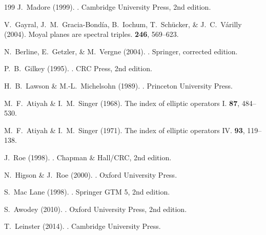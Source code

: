 \documentclass[11pt,a4paper,openright]{book}
\theoremstyle{plain}
\theoremstyle{definition}
\begin{document}
\begin{thebibliography}{199}
J.~Madore (1999).
.
\newblock Cambridge University Press, 2nd edition.

V.~Gayral, J.~M.~Gracia-Bondía, B.~Iochum, T.~Schücker, \& J.~C.~Várilly (2004).
\newblock Moyal planes are spectral triples.
 {\bf 246}, 569--623.


N.~Berline, E.~Getzler, \& M.~Vergne (2004).
.
\newblock Springer, corrected edition.

P.~B.~Gilkey (1995).
.
\newblock CRC Press, 2nd edition.

H.~B.~Lawson \& M.-L.~Michelsohn (1989).
.
\newblock Princeton University Press.

M.~F.~Atiyah \& I.~M.~Singer (1968).
\newblock The index of elliptic operators I.
 {\bf 87}, 484--530.

M.~F.~Atiyah \& I.~M.~Singer (1971).
\newblock The index of elliptic operators IV.
 {\bf 93}, 119--138.

J.~Roe (1998).
.
\newblock Chapman \& Hall/CRC, 2nd edition.

N.~Higson \& J.~Roe (2000).
.
\newblock Oxford University Press.


S.~Mac Lane (1998).
.
\newblock Springer GTM 5, 2nd edition.

S.~Awodey (2010).
.
\newblock Oxford University Press, 2nd edition.

T.~Leinster (2014).
.
\newblock Cambridge University Press.


\end{thebibliography}
\end{document}

